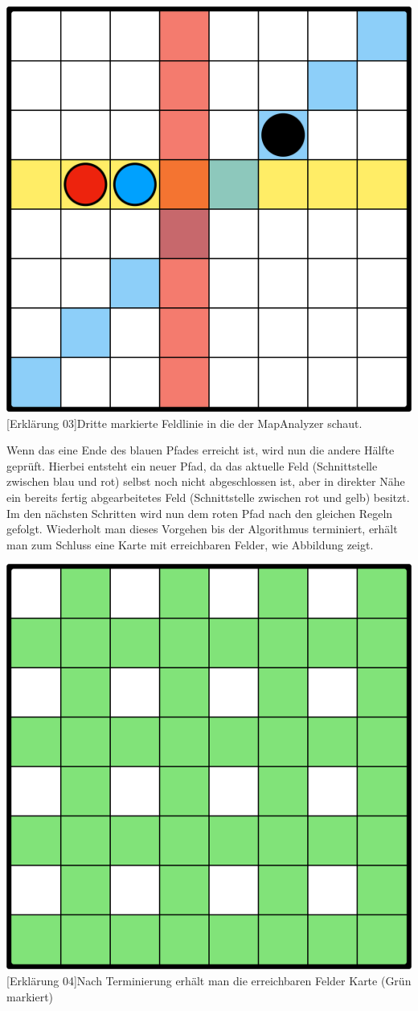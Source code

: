 \vspace{1em}
\begin{minipage}{\linewidth}
    \centering
    \includegraphics[width=0.45\linewidth]{pics/explaination/explaination-03}
    [Erkl\"arung 03]{Dritte markierte Feldlinie in die der MapAnalyzer schaut.}
    \label{fig:explaination-03}
\end{minipage}
\vspace{0.5em}

Wenn das eine Ende des blauen Pfades erreicht ist, wird nun die andere H\"alfte gepr\"uft.
Hierbei entsteht ein neuer Pfad, da das aktuelle Feld (Schnittstelle zwischen blau und rot) selbst noch nicht abgeschlossen ist, aber in direkter N\"ahe ein bereits fertig abgearbeitetes Feld (Schnittstelle zwischen rot und gelb) besitzt.
Im den n\"achsten Schritten wird nun dem roten Pfad nach den gleichen Regeln gefolgt.
Wiederholt man dieses Vorgehen bis der Algorithmus terminiert, erh\"alt man zum Schluss eine Karte mit erreichbaren Felder, wie Abbildung  zeigt.

\vspace{1em}
\begin{minipage}{\linewidth}
    \centering
    \includegraphics[width=0.45\linewidth]{pics/explaination/explaination-04}
    [Erkl\"arung 04]{Nach Terminierung erh\"alt man die erreichbaren Felder Karte (Gr\"un markiert)}
    \label{fig:explaination-04}
\end{minipage}

